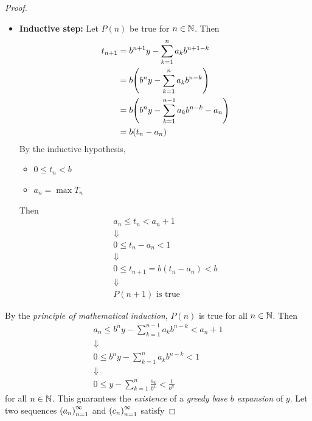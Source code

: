 \begin{proof}
\begin{itemize}
\[\begin{array}{c}
            \Downarrow \\
            P(1) \text{ is true}
        \end{array}
        \]
        \item \textbf{Inductive step:} Let $P(n)$ be true for $n \in \N$. Then
        \begin{align*}
            t_{n + 1} &= b^{n + 1}y - \sum_{k = 1}^{n} a_{k}b^{n + 1 - k} \\
            &= b\paren*{b^{n}y - \sum_{k = 1}^{n} a_{k}b^{n - k}} \\
            &= b\paren*{b^{n}y - \sum_{k = 1}^{n - 1} a_{k}b^{n - k} - a_{n}} \\
            &= b\paren*{t_{n} - a_{n}}
        \end{align*}
        By the inductive hypothesis,
        \begin{itemize}
            \item $0 \leq t_{n} < b$
            \item $a_{n} = \max T_{n}$
        \end{itemize}
        Then
        \[
        \begin{array}{c}
            a_{n} \leq t_{n} < a_{n} + 1 \\
            \Downarrow \\
            0 \leq t_{n} - a_{n} < 1 \\
            \Downarrow \\
            0 \leq t_{n + 1} = b(t_{n} - a_{n}) < b \\
            \Downarrow \\
            P(n + 1) \text{ is true}
        \end{array}
        \]
    \end{itemize}
    By the \emph{principle of mathematical induction}, $P(n)$ is true for all $n \in \N$. Then
    \[
    \begin{array}{c}
        a_{n} \leq b^{n}y - \sum_{k = 1}^{n - 1} a_{k}b^{n - k} < a_{n} + 1 \\
        \Downarrow \\
        0 \leq b^{n}y - \sum_{k = 1}^{n} a_{k}b^{n - k} < 1 \\
        \Downarrow \\
        0 \leq y - \sum_{k = 1}^{n} \frac{a_{k}}{b^{k}} < \frac{1}{b^{n}}
    \end{array}
    \]
    for all $n \in \N$. This guarantees the \emph{existence} of a \emph{greedy base $b$ expansion} of $y$.
    Let two sequences $\paren*{a_{n}}_{n = 1}^{\infty}$ and $\paren*{c_{n}}_{n = 1}^{\infty}$ satisfy

\end{proof}
